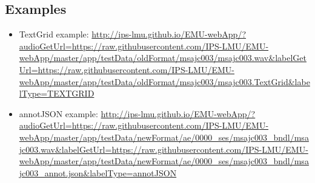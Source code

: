 \documentclass[]{book}
\providecommand{\tightlist}{%
  \setlength{\itemsep}{0pt}\setlength{\parskip}{0pt}}
\theoremstyle{definition}
\theoremstyle{definition}
\theoremstyle{definition}
\theoremstyle{remark}
\begin{document}
\hypertarget{examples-1}{%
\subsection{Examples}\label{examples-1}}

\begin{itemize}
\tightlist
\item
  TextGrid example:
  \url{http://ips-lmu.github.io/EMU-webApp/?audioGetUrl=https://raw.githubusercontent.com/IPS-LMU/EMU-webApp/master/app/testData/oldFormat/msajc003/msajc003.wav\&labelGetUrl=https://raw.githubusercontent.com/IPS-LMU/EMU-webApp/master/app/testData/oldFormat/msajc003/msajc003.TextGrid\&labelType=TEXTGRID}
\item
  annotJSON example:
  \url{http://ips-lmu.github.io/EMU-webApp/?audioGetUrl=https://raw.githubusercontent.com/IPS-LMU/EMU-webApp/master/app/testData/newFormat/ae/0000_ses/msajc003_bndl/msajc003.wav\&labelGetUrl=https://raw.githubusercontent.com/IPS-LMU/EMU-webApp/master/app/testData/newFormat/ae/0000_ses/msajc003_bndl/msajc003_annot.json\&labelType=annotJSON}
\end{itemize}


\end{document}
